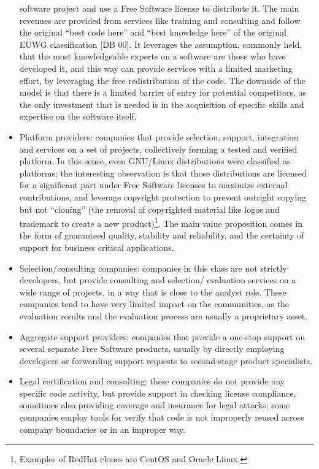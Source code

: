 \begin{itemize}
software project and use a Free Software license to distribute it. The main
revenues are provided from services like training and consulting and follow the original ``best code here'' and ``best knowledge here'' of the original EUWG classification [DB 00]. It leverages the assumption, commonly held, that the most knowledgeable experts on a software are those who have developed it, and this way can provide services with a limited marketing effort, by leveraging the free redistribution of the code. The downside of the model is that there is a limited barrier of entry for potential competitors, as the only investment that is needed is in the acquisition of specific skills and expertise on the software itself.
 \item Platform providers: companies that provide selection, support,
integration and services on a set of projects, collectively forming a tested and
verified platform. In this sense, even GNU/Linux distributions were classified
as platforms; the interesting observation is that those distributions are
licensed for a significant part under Free Software licenses to maximize
external contributions, and leverage copyright protection to prevent outright
copying but not ``cloning'' (the removal of copyrighted material like logos and
trademark to create a new product)\footnote{Examples of RedHat clones are CentOS
and Oracle Linux.}. The main value proposition comes in the
form of guaranteed quality, stability and reliability, and the certainty of
support for business critical applications.
 \item Selection/consulting companies: companies in this class are not strictly
developers, but provide consulting and selection/ evaluation services on a wide
range of projects, in a way that is close to the analyst role. These companies
tend to have very limited impact on the communities, as the
evaluation results and the evaluation process are usually a proprietary asset.
 \item Aggregate support providers: companies that provide a one-stop support on
several separate Free Software products, usually by directly employing
developers or forwarding support requests to second-stage product specialists.
 \item Legal certification and consulting: these companies do not provide any
specific code activity, but provide support in checking license compliance,
sometimes also providing coverage and insurance for legal attacks; some
companies employ tools for verify that code is not improperly reused across
company boundaries or in an improper way.

\end{itemize}
